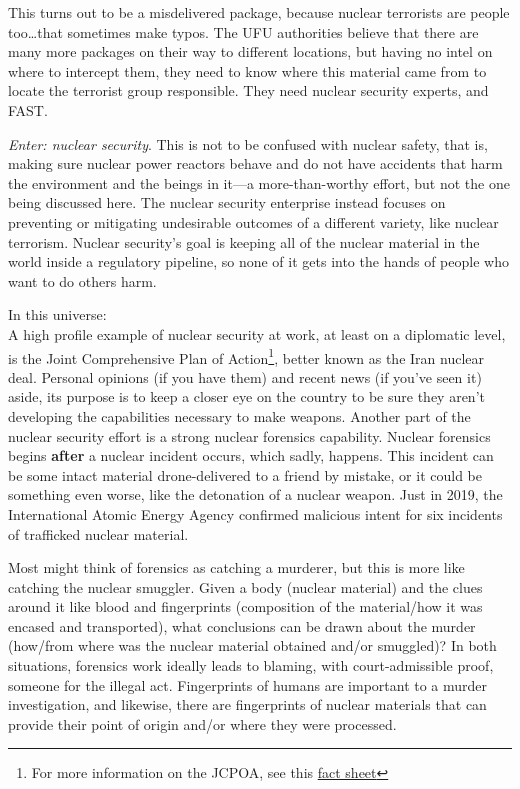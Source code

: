 {\begin{shadequote} 

  This turns out to be a misdelivered package, because nuclear terrorists are
  people too\ldots that sometimes make typos. The UFU authorities believe that
  there are many more packages on their way to different locations, but having
  no intel on where to intercept them, they need to know where this material
  came from to locate the terrorist group responsible. They need nuclear
  security experts, and FAST.

\end{shadequote}

\narr \textit{Enter: nuclear security}. This is not to be confused with nuclear
safety, that is, making sure nuclear power reactors behave and do not have
accidents that harm the environment and the beings in it---a more-than-worthy
effort, but not the one being discussed here. The nuclear security enterprise
instead focuses on preventing or mitigating undesirable outcomes of a different
variety, like nuclear terrorism. Nuclear security's goal is keeping all of the
nuclear material in the world inside a regulatory pipeline, so none of it gets
into the hands of people who want to do others harm.

\noindent In this universe:\\ A high profile example of nuclear security at
work, at least on a diplomatic level, is the Joint Comprehensive Plan of
Action\footnote{For more information on the JCPOA, see this
\href{https://www.armscontrol.org/factsheets/JCPOA-at-a-glance}{\color{blue}fact
sheet}}, better known as the Iran nuclear deal. Personal opinions (if you have
them) and recent news (if you've seen it) aside, its purpose is to keep a
closer eye on the country to be sure they aren't developing the capabilities
necessary to make weapons.  Another part of the nuclear security effort is a
strong nuclear forensics capability.  Nuclear forensics begins \textbf{after} a
nuclear incident occurs, which sadly, happens. This incident can be some intact
material drone-delivered to a friend by mistake, or it could be something even
worse, like the detonation of a nuclear weapon. Just in 2019, the International
Atomic Energy Agency confirmed malicious intent for six incidents of trafficked
nuclear material.

Most might think of forensics as catching a murderer, but this is more like
catching the nuclear smuggler. Given a body (nuclear material) and the clues
around it like blood and fingerprints (composition of the material\slash how it
was encased and transported), what conclusions can be drawn about the murder
(how\slash from where was the nuclear material obtained and\slash or smuggled)?
In both situations, forensics work ideally leads to blaming, with
court-admissible proof, someone for the illegal act. Fingerprints of humans are
important to a murder investigation, and likewise, there are fingerprints of
nuclear materials that can provide their point of origin and\slash or where
they were processed.

}
